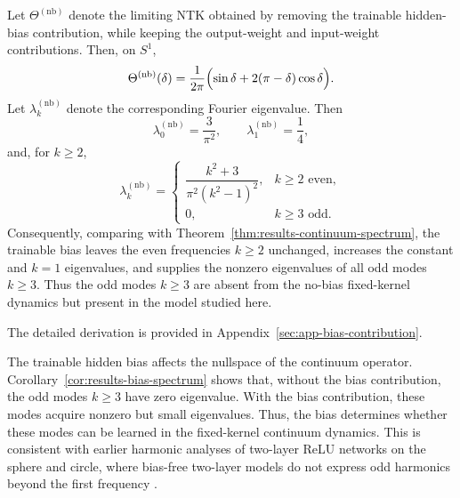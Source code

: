 \begin{corollary}
	\label{cor:results-bias-spectrum}
	Let \(\Theta^{(\mathrm{nb})}\) denote the limiting NTK obtained by removing the
	trainable hidden-bias contribution, while keeping the output-weight and input-weight
	contributions. Then, on \(S^1\),
	\begin{equation}
		\Theta^{(\mathrm{nb})}(\delta)
		=
		\frac{1}{2\pi}
		\Bigl(
		\sin\delta+2(\pi-\delta)\cos\delta
		\Bigr).
		\label{eq:results-no-bias-kernel}
	\end{equation}
	Let \(\lambda_k^{(\mathrm{nb})}\) denote the corresponding Fourier eigenvalue. Then
	\begin{equation}
		\lambda_0^{(\mathrm{nb})}=\frac{3}{\pi^2},
		\qquad
		\lambda_1^{(\mathrm{nb})}=\frac14,
		\label{eq:results-no-bias-lambda-0-1}
	\end{equation}
	and, for \(k\ge 2\),
	\begin{equation}
		\lambda_k^{(\mathrm{nb})}
		=
		\begin{cases}
			\dfrac{k^2+3}{\pi^2(k^2-1)^2}, & k\ge 2 \text{ even}, \\[1em]
			0,                             & k\ge 3 \text{ odd}.
		\end{cases}
		\label{eq:results-no-bias-lambda-k}
	\end{equation}
	Consequently, comparing with Theorem~\ref{thm:results-continuum-spectrum}, the
	trainable bias leaves the even frequencies \(k\ge 2\) unchanged, increases the constant
	and \(k=1\) eigenvalues, and supplies the nonzero eigenvalues of all odd modes
	\(k\ge 3\). Thus the odd modes \(k\ge 3\) are absent from the no-bias fixed-kernel
	dynamics but present in the model studied here.
\end{corollary}

The detailed derivation is provided in Appendix~\ref{sec:app-bias-contribution}.

The trainable hidden bias affects the nullspace of the continuum operator.
Corollary~\ref{cor:results-bias-spectrum} shows that, without the bias
contribution, the odd modes \(k\ge 3\) have zero eigenvalue. With the bias
contribution, these modes acquire nonzero but small eigenvalues. Thus, the bias
determines whether these modes can be learned in the fixed-kernel continuum
dynamics. This is consistent with earlier harmonic analyses of two-layer ReLU networks on
the sphere and circle, where bias-free two-layer models do not express odd
harmonics beyond the first frequency
\citep{basri2019convergence,basri2020frequencybiasneuralnetworks}.

